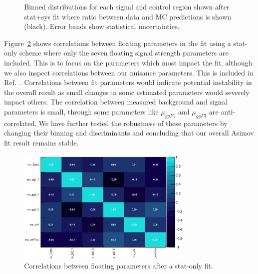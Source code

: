 \begin{figure}[!h]
{  }\hfill
  \hfill
{\caption{Binned distributions for each signal and control region shown after stat+sys fit where ratio between data and MC predictions is shown (black). Error bands show statistical uncertainties.}
\label{fig:fitresultsregions}}
\end{figure}

Figure~\ref{fig:correlations} shows correlations between floating parameters in the fit using a stat-only scheme where only the seven floating signal strength parameters are included. This is to focus on the parameters which most impact the fit, although we also inspect correlations between our nuisance parameters. This is included in Ref.~\cite{ourSupportNote}. Correlations between fit parameters would indicate potential instability in the overall result as small changes in some estimated parameters would severely impact others. The correlation between measured background and signal parameters is small, through some parameters like $\mu_{ggF1}$ and $\mu_{ggF3}$ are anti-correlated. We have further tested the robustness of these parameters by changing their binning and discriminants and concluding that our overall Asimov fit result remains stable.  

\begin{figure}[!h]
\centering
\includegraphics[width=0.75\textwidth]{Pictures/fitresults/correlation_stat.eps}
\caption{Correlations between floating parameters after a stat-only fit.}
\label{fig:correlations}
\end{figure}

